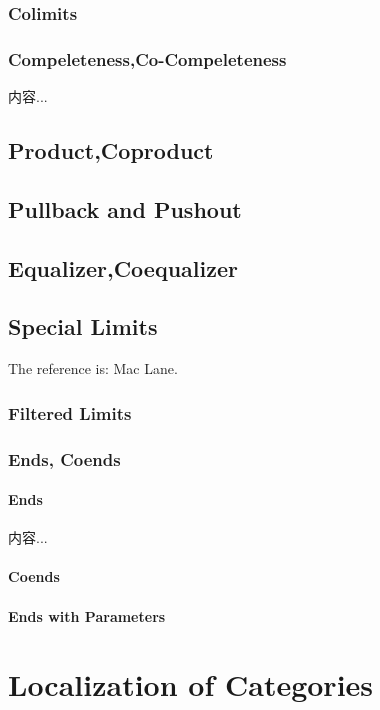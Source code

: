 \documentclass[Total.tex]{subfiles}
\begin{document}
		\subsection{Colimits}
		
		\subsection{Compeleteness,Co-Compeleteness}
		\begin{Def}
			内容...
		\end{Def}
		\section{Product,Coproduct}
		\section{Pullback and Pushout}
		\section{Equalizer,Coequalizer}
		\section{Special Limits}
			The reference is: Mac Lane.  
			\subsection{Filtered Limits}
			\subsection{Ends, Coends}
				\subsubsection{Ends}
				\begin{Def}
					内容...
				\end{Def}
				
			\subsubsection{Coends}
			\subsubsection{Ends with Parameters}
	\chapter{Localization of Categories}
\end{document}
